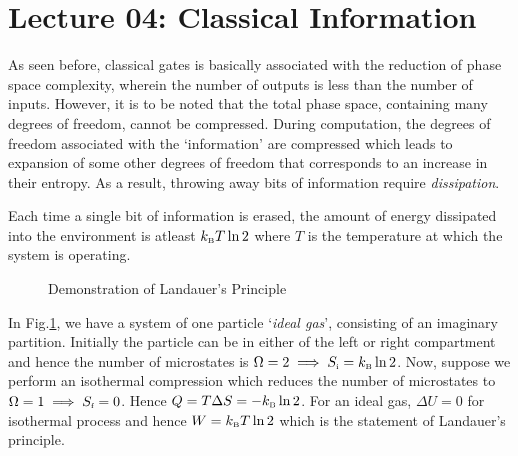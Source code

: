 \section*{Lecture 04: Classical Information}
As seen before, classical gates is basically associated with the reduction of phase space complexity, wherein the number of outputs is less than the number of inputs. However, it is to be noted that the total phase space, containing many degrees of freedom, cannot be compressed. During computation, the degrees of freedom associated with the `information' are compressed which leads to expansion of some other degrees of freedom that corresponds to an increase in their entropy. As a result, throwing away bits of information require \textit{dissipation}. 
\begin{principle}[Landauer]
Each time a single bit of information is erased, the amount of energy dissipated into the environment is atleast $k_{\text{\tiny B}} T \ln 2$ where $T$ is the temperature at which the system is operating. 
\end{principle}
\begin{figure}[H]
    \centering 
    
    \caption{Demonstration of Landauer's Principle}
     \label{fig:land}
\end{figure}
\noindent
In Fig.\ref{fig:land}, we have a system of one particle `\textit{ideal gas}', consisting of an imaginary partition. Initially the particle can be in either of the left or right compartment and hence the number of microstates is $\Omega=2 \implies S_{\text{\tiny i}}= k_{\text{\tiny B}} \ln 2$. Now, suppose we perform an isothermal compression which reduces the number of microstates to $\Omega=1\implies S_{\text{\tiny f}}=0$. Hence $Q = T\Delta S = -k_{\text{\tiny B}}\ln 2$. For an ideal gas, $\Delta U=0$ for isothermal process and hence $W = k_{\text{\tiny B}}T\ln 2$ which is the statement of Landauer's principle.
